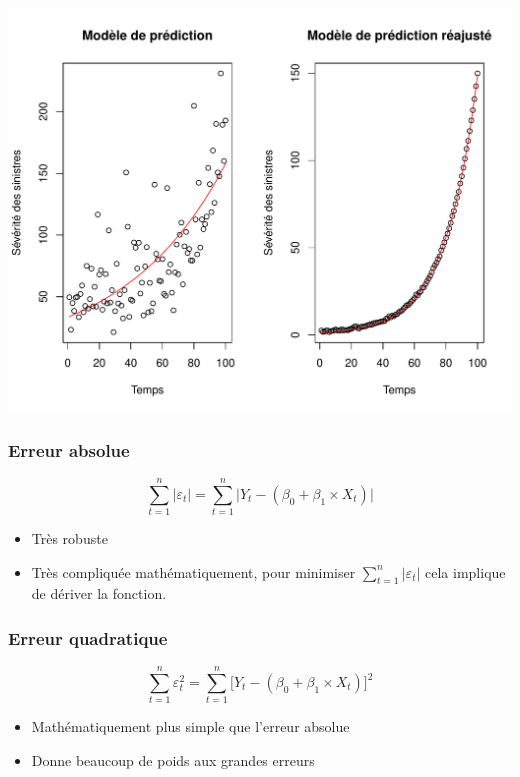 \documentclass[11pt,french]{report}
\begin{document}
\includegraphics{notes_de_cours-006}

\subsubsection{Erreur absolue}
\begin{equation}
\sum_{t=1}^n |\varepsilon_t| = \sum_{t=1}^n \Big| Y_t - (\beta_0 + \beta_1\times X_t) \Big| 
\end{equation}
\begin{itemize}
\item Très robuste
\item Très compliquée mathématiquement, pour minimiser $\sum_{t=1}^n |\varepsilon_t|$ cela implique de dériver la fonction.
\end{itemize}

\subsubsection{Erreur quadratique}
\begin{equation}
\sum_{t=1}^n \varepsilon_t^2 = \sum_{t=1}^n \Big[ Y_t - (\beta_0 + \beta_1\times X_t) \Big]^2 
\end{equation}
\begin{itemize}
\item Mathématiquement plus simple que l'erreur absolue
\item Donne beaucoup de poids aux grandes erreurs
\end{itemize}
\end{document}

